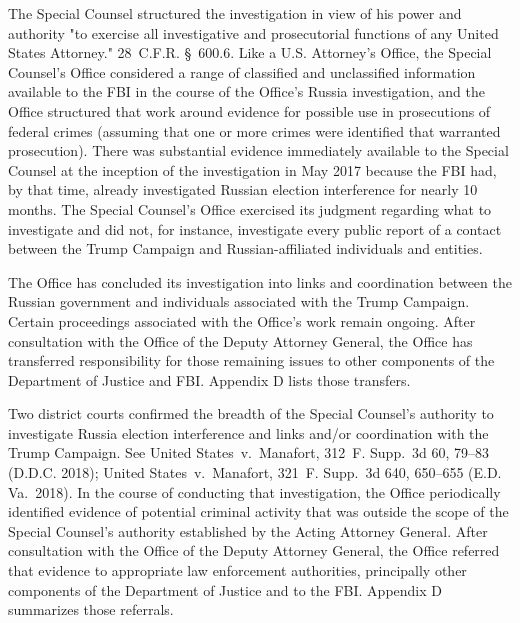 The Special Counsel structured the investigation in view of his power and authority "to exercise all investigative and prosecutorial functions of any United States Attorney." 28~C.F.R. \S~600.6. Like a U.S. Attorney's Office, the Special Counsel's Office considered a range of classified and unclassified information available to the FBI in the course of the Office's Russia investigation, and the Office structured that work around evidence for possible use in prosecutions of federal crimes (assuming that one or more crimes were identified that warranted prosecution).
There was substantial evidence immediately available to the Special Counsel at the inception of the investigation in May 2017 because the FBI had, by that time, already investigated Russian election interference for nearly 10 months.
The Special Counsel's Office exercised its judgment regarding what to investigate and did not, for instance, investigate every public report of a contact between the Trump Campaign and Russian-affiliated individuals and entities.

The Office has concluded its investigation into links and coordination between the Russian government and individuals associated with the Trump Campaign.
Certain proceedings associated with the Office's work remain ongoing.
After consultation with the Office of the Deputy Attorney General, the Office has transferred responsibility for those remaining issues to other components of the Department of Justice and FBI\null.
Appendix D lists those transfers.

Two district courts confirmed the breadth of the Special Counsel's authority to investigate Russia election interference and links and/or coordination with the Trump Campaign.
See United States~v.\ Manafort, 312~F. Supp.~3d 60, 79--83 (D.D.C. 2018); United States~v.\ Manafort, 321~F. Supp.~3d 640, 650--655 (E.D. Va.~2018).
In the course of conducting that investigation, the Office periodically identified evidence of potential criminal activity that was outside the scope of the Special Counsel's authority established by the Acting Attorney General.
After consultation with the Office of the Deputy Attorney General, the Office referred that evidence to appropriate law enforcement authorities, principally other components of the Department of Justice and to the FBI\null.
Appendix D summarizes those referrals.

\hr

